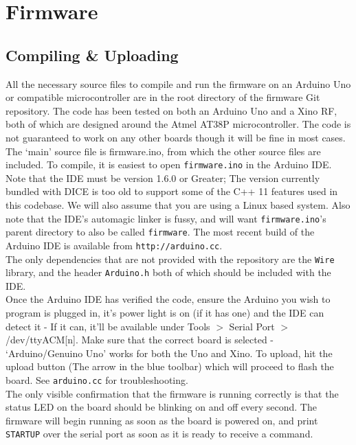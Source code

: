 %
%

\section{Firmware}

\subsection{Compiling \& Uploading}

All the necessary source files to compile and run the firmware on an Arduino Uno or compatible microcontroller are in the root directory of the firmware Git repository. The code has been tested on both an Arduino Uno and a Xino RF, both of which are designed around the Atmel AT38P microcontroller. The code is not guaranteed to work on any other boards though it will be fine in most cases.\\

The `main' source file is firmware.ino, from which the other source files are included. To compile, it is easiest to open \texttt{firmware.ino} in the Arduino IDE. Note that the IDE must be version 1.6.0 or Greater; The version currently bundled with DICE is too old to support some of the C++ 11 features used in this codebase. We will also assume that you are using a Linux based system. Also note that the IDE's automagic linker is fussy, and will want \texttt{firmware.ino}'s parent directory to also be called \texttt{firmware}. The most recent build of the Arduino IDE is available from \texttt{http://arduino.cc}.\\

The only dependencies that are not provided with the repository are the \verb|Wire| library, and the header \verb|Arduino.h| both of which should be included with the IDE.\\

Once the Arduino IDE has verified the code, ensure the Arduino you wish to program is plugged in, it's power light is on (if it has one) and the IDE can detect it - If it can, it'll be available under Tools $>$ Serial Port $>$ /dev/ttyACM[n]. Make sure that the correct board is selected - `Arduino/Genuino Uno' works for both the Uno and Xino. To upload, hit the upload button (The arrow in the blue toolbar) which will proceed to flash the board. See \texttt{arduino.cc} for troubleshooting.\\

The only visible confirmation that the firmware is running correctly is that the status LED on the board should be blinking on and off every second. The firmware will begin running as soon as the board is powered on, and print \texttt{STARTUP} over the serial port as soon as it is ready to receive a command.

